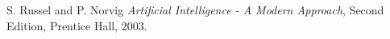 \begin{thebibliography}{99}
	
	 {\sc S. Russel and P. Norvig }  \textit{Artificial Intelligence - A Modern Approach},
	Second Edition, Prentice Hall, 2003.
	
\end{thebibliography}

